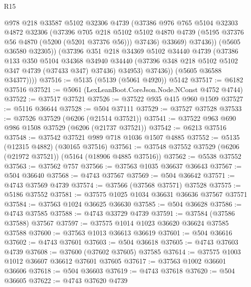 \begin{lexlean}{R15}
\begin{coremodule}
{{{{{{{{{{{                  @978
                  @218
                  @33587
                  @5102
                  @32306
                  @4739
                  (@37386
                    @976
                    @765
                    @5104
                    @32303
                    @4872
                    @32306
                    (@37396
                      @705
                      @218
                      @5102
                      @5102
                      @4870
                      @4739
                      (@5195 @37376 @56 @4870 (@5200 (@5201 @37376 @56)))
                      @37436)
                    @33669)
                  @37436))
              (@5605 @36580 @32305))
            (@37396
              @351
              @218
              @34369
              @5102
              @34440
              @4739
              (@37386
                @133
                @350
                @5104
                @34368
                @34940
                @34440
                (@37396 @348 @218 @5102 @5102 @347 @4739 (@37433 @347) @37436)
                @34953)
              @37436))
          (@5605 @36588 @34377))))
@37516 := @5135 (@5139 (@5061 @4920)) @5142
@37517 := @6182 @37516
@37521 := @5061 (LexLeanBoot.CoreJson.Node.NConst @4752 @4744)
@37522 := @37517 @37521
@37526 := @37522 @935 @415 @960 @1509
@37527 := @5116 @36644
@37528 := @504 @37111
@37529 := @37527 @37528
@37533 := @37526 @37529 (@6206 (@21514 @37521))
@37541 := @37522 @963 @690 @986 @1508 @37529 (@6206 (@21737 @37521))
@37542 := @6213 @37516
@37548 := @37542 @37521 @989 @718 @1036 @1507 @4885
@37552 := @5135 (@12315 @4882) (@30165 @37516)
@37561 := @37548 @37552 @37529 (@6206 (@21972 @37521)) (@5164 (@18906 @4885 @37516))
@37562 := @5538 @37552
@37563 := @37562 @757
@37566 := @37563 @1035 @36637 @36643
@37567 := @504 @36640
@37568 := @4743 @37567
@37569 := @504 @36642
@37571 := @4743 @37569 @4739
@37574 := @37566 (@37568 @37571) @37528
@37575 := @5186 @37552
@37581 := @37575 @1025 @1034 @36631 @36636 @37567 @37571
@37584 := @37563 @1024 @36625 @36630
@37585 := @504 @36628
@37586 := @4743 @37585
@37588 := @4743 @33729 @4739
@37591 := @37584 (@37586 @37588) @37567
@37597 := @37575 @1014 @1023 @36620 @36624 @37585 @37588
@37600 := @37563 @1013 @36613 @36619
@37601 := @504 @36616
@37602 := @4743 @37601
@37603 := @504 @36618
@37605 := @4743 @37603 @4739
@37608 := @37600 (@37602 @37605) @37585
@37614 := @37575 @1003 @1012 @36607 @36612 @37601 @37605
@37617 := @37563 @1002 @36601 @36606
@37618 := @504 @36603
@37619 := @4743 @37618
@37620 := @504 @36605
@37622 := @4743 @37620 @4739
}}}}}}}}}}}
\end{coremodule}
\end{lexlean}
